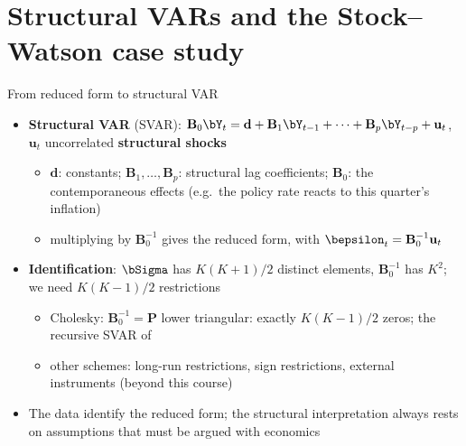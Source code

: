 \section{Structural VARs and the Stock--Watson case study}

\begin{frame}{From reduced form to structural VAR}
\itemsize{\small}
\begin{itemize}
    \item \textbf{Structural VAR} (SVAR): $\mathbf{B}_0\bY_t = \mathbf{d} + \mathbf{B}_1\bY_{t-1} + \dots + \mathbf{B}_p\bY_{t-p} + \mathbf{u}_t$, $\mathbf{u}_t$ uncorrelated \textbf{structural shocks}
    \begin{itemize}
        \item $\mathbf{d}$: constants; $\mathbf{B}_1, \dots, \mathbf{B}_p$: structural lag coefficients; $\mathbf{B}_0$: the contemporaneous effects (e.g.\ the policy rate reacts to this quarter's inflation)
        \item multiplying by $\mathbf{B}_0^{-1}$ gives the reduced form, with $\bepsilon_t = \mathbf{B}_0^{-1}\mathbf{u}_t$
    \end{itemize}
    \item \textbf{Identification}: $\bSigma$ has $K(K+1)/2$ distinct elements, $\mathbf{B}_0^{-1}$ has $K^2$; we need $K(K-1)/2$ restrictions
    \begin{itemize}
        \item Cholesky: $\mathbf{B}_0^{-1} = \mathbf{P}$ lower triangular: exactly $K(K-1)/2$ zeros; the recursive SVAR of 
        \item other schemes: long-run restrictions, sign restrictions, external instruments (beyond this course)
    \end{itemize}
    \item The data identify the reduced form; the structural interpretation always rests on assumptions that must be argued with economics
\end{itemize}
\end{frame}

